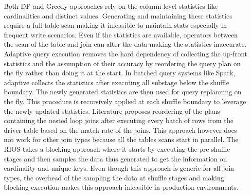 Both DP and Greedy approaches rely on the column level statistics like cardinalities and distinct values. Generating and maintaining these statistics require a full table scan making it infeasible to maintain stats especially in frequent write scenarios. Even if the statistics are available, operators between the scan of the table and join can alter the data making the statistics inaccurate. Adaptive query execution removes the hard dependency of collecting the up-front statistics and the assumption of their accuracy by reordering the query plan on the fly rather than doing it at the start. In batched query systems like Spark, adaptive collects the statistics after executing all substage below the shuffle boundary.
The newly generated statistics are then used for query replanning on the fly. This procedure is recursively applied at each shuffle boundary to leverage the newly updated statistics. Literature \cite{b7} proposes reordering of the plans containing the nested loop joins after executing every batch of rows from the driver table based on the match rate of the joins. This approach however does not work for other join types because all the tables scans start in parallel. The  RIOS \cite{b8} takes a blocking approach where it starts by executing the pre-shuffle stages and then samples the data thus generated to get the information on cardinality and unique keys. Even though this approach is generic for all join types, the overhead of the sampling the data at shuffle stages and making blocking execution makes this approach infeasible in production environments.
